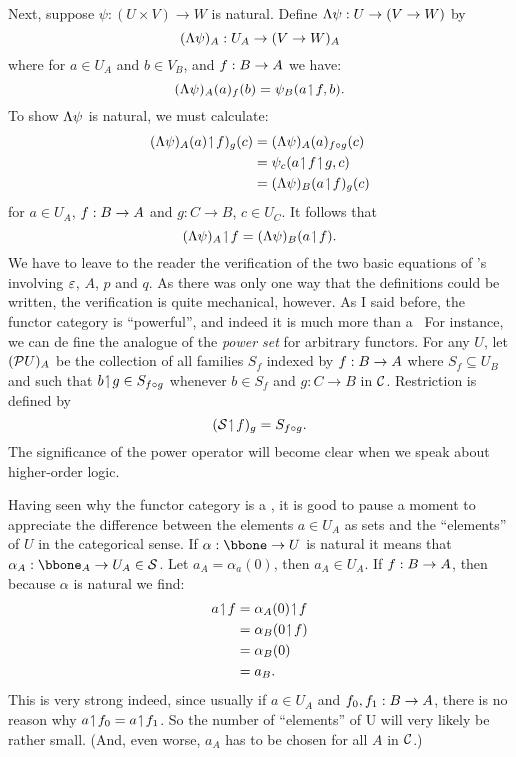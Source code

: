 Next, suppose $\psi: (U \times V) \to W$ is natural. Define $\Lambda \psi  : U\rightarrow (V\rightarrow W)$ by
%
$$
(\Lambda \psi)_A: U_A \rightarrow (V \rightarrow W)_A
$$
%
where for $a \in U_A$ and $b \in V_B$, and $f: B \rightarrow A$ we have:
$$
(\Lambda \psi)_A (a)_f (b) = \psi_B (a \!\upharpoonleft\! f, b).
$$
To show $\Lambda\psi$ is natural, we must calculate:
\begin{align*}
(\L \psi)_A (a)\res f)_g (c) &= (\L \psi)_A(a)_{f \comp g} (c)\\
&= \psi_c(a \res f \res g,c)\\
&= (\L \psi)_B(a \res f)_g (c)
\end{align*}
%
for $a \in U_A$, $f : B \rightarrow A$ and $g: C\to B$, $c \in U_C$. It follows that
$$
(\Lambda \psi)_A \!\upharpoonleft\! f = (\Lambda \psi)_B (a \!\upharpoonleft\! f).
$$
%
We have to leave to the reader the verification of the two basic equations of \ccc's
involving $\varepsilon$, $A$, $p$ and $q$. As there was only one way that the definitions could be
written, the verification is quite mechanical, however. As I said before, the functor
category is ``powerful'', and indeed it is much more than a \ccc\  For instance, we can de
fine the analogue of the {\it power set} for arbitrary functors. For any $U$, let
$(\mathcal P U)_A$ be the collection of all families $S_f$ indexed by $f: B \rightarrow A$ where $S_f \subseteq
U_B$ and such that $b\!\upharpoonleft\! g \in S_{f \circ g}$ whenever $b\in S_f$ and $g: C\to B$ in
$\mathcal C$. Restriction is defined by
$$
(\mathcal S \!\upharpoonleft\! f)_g = S_{f \circ g}.
$$
%
The significance of the power operator will become clear when we speak about higher-order
logic.

Having seen why the functor category is a \ccc, it is good to pause a moment to appreciate
the difference between the elements $a \in U_A$ as sets and the ``elements'' of $U$ in the
categorical sense. If $\alpha : \bbone \to U$ is natural it means that $\alpha_A  :
\bbone_A  \to U_A \in \S$. Let $a_A = \alpha_a(0)$, then $a_A \in U_A$. If $f:B \rightarrow A$, then
because $\alpha$ is natural we find:
\begin{align*}
a \!\upharpoonleft\! f &= \alpha_A(0) \!\upharpoonleft\! f\\
&= \alpha_B(0 \!\upharpoonleft\! f)\\
&= \alpha_B(0)\\
&= a_B .
\end{align*}
This is very strong indeed, since usually if $a \in U_A$ and $f_0, f_1 :B \rightarrow A$, there is no
reason why $a \!\upharpoonleft\! f_0 = a \!\upharpoonleft\! f_1$. So the number of ``elements'' of U will very likely
be rather small. (And, even worse, $a_A$ has to be chosen for all $A$ in $\mathcal C$.)

